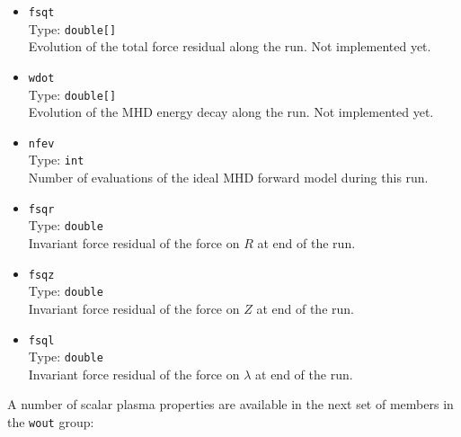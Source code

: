 \begin{itemize}
 \item \texttt{fsqt} \\
       Type: \texttt{double[]} \\
       Evolution of the total force residual along the run.
       Not implemented yet.
 \item \texttt{wdot} \\
       Type: \texttt{double[]} \\
       Evolution of the MHD energy decay along the run.
       Not implemented yet.
 \item \texttt{nfev} \\
       Type: \texttt{int} \\
       Number of evaluations of the ideal MHD forward model during this run.
 \item \texttt{fsqr} \\
       Type: \texttt{double} \\
       Invariant force residual of the force on $R$ at end of the run.
 \item \texttt{fsqz} \\
       Type: \texttt{double} \\
       Invariant force residual of the force on $Z$ at end of the run.
 \item \texttt{fsql} \\
       Type: \texttt{double} \\
       Invariant force residual of the force on $\lambda$ at end of the run.
\end{itemize}
%
A number of scalar plasma properties are available
in the next set of members in the \texttt{wout} group:
